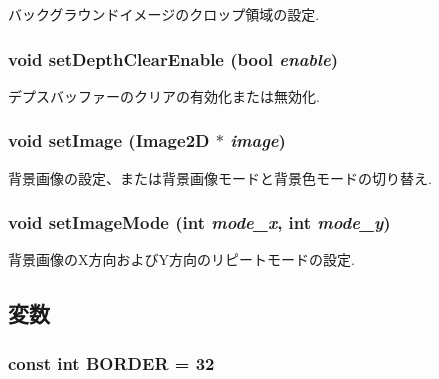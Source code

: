 バックグラウンドイメージのクロップ領域の設定. \hypertarget{classm3g_1_1Background_0953a713c22fd40cd586bcd8af80075a}{
\subsubsection[{setDepthClearEnable}]{\setlength{\rightskip}{0pt plus 5cm}void setDepthClearEnable (bool {\em enable})}}
\label{classm3g_1_1Background_0953a713c22fd40cd586bcd8af80075a}


デプスバッファーのクリアの有効化または無効化. \hypertarget{classm3g_1_1Background_705b89b41cd1b38f664ed912be44baaa}{
\subsubsection[{setImage}]{\setlength{\rightskip}{0pt plus 5cm}void setImage ({\bf Image2D} $\ast$ {\em image})}}
\label{classm3g_1_1Background_705b89b41cd1b38f664ed912be44baaa}


背景画像の設定、または背景画像モードと背景色モードの切り替え. \hypertarget{classm3g_1_1Background_aba37cb460a2376f1a4722eebb4de9a9}{
\subsubsection[{setImageMode}]{\setlength{\rightskip}{0pt plus 5cm}void setImageMode (int {\em mode\_\-x}, \/  int {\em mode\_\-y})}}
\label{classm3g_1_1Background_aba37cb460a2376f1a4722eebb4de9a9}


背景画像のX方向およびY方向のリピートモードの設定. 

\subsection{変数}
\hypertarget{classm3g_1_1Background_ee380e01b33e589c24984e4c4c1c6501}{
\subsubsection[{BORDER}]{\setlength{\rightskip}{0pt plus 5cm}const int {\bf BORDER} = 32}}
\label{classm3g_1_1Background_ee380e01b33e589c24984e4c4c1c6501}



